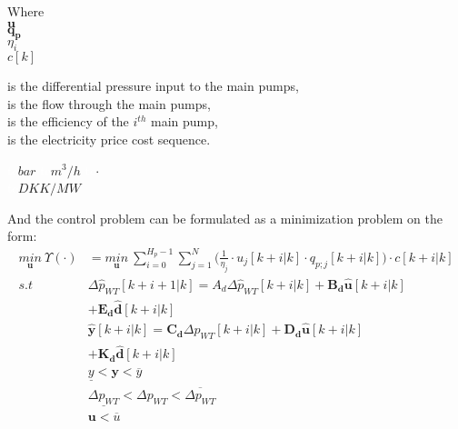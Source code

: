 \begin{minipage}[t]{0.20\textwidth}
Where\\
\hspace*{8mm} $\pmb{u}$ \\
\hspace*{8mm} $\pmb{q_p}$ \\
 \hspace*{8mm} $\eta_i$ \\
\hspace*{8mm} $c[k]$ 
\end{minipage}
\begin{minipage}[t]{0.68\textwidth}
\vspace*{2mm}
is the differential pressure input to the main pumps,\\
is the flow through the main pumps,\\
is the efficiency of the $i^{th}$ main pump,\\
is the electricity price cost sequence.
\end{minipage}
\begin{minipage}[t]{0.10\textwidth}
\vspace*{2mm}
\textcolor{White}{te}$\unit{bar}$
\textcolor{White}{te}$\unit{m^3/h}$
 \textcolor{White}{te}$\unit{\cdot}$\\
\textcolor{White}{te}$\unit{DKK/MW}$
\end{minipage}

And the control problem can be formulated as a minimization problem on the form:
\begin{align}
\underset{\pmb{u}}{min} \:  \Upsilon(\cdot) &= \underset{\pmb{u}}{min} \: \sum_{i=0}^{H_p-1} \sum_{j=1}^{N} \Big(\frac{1}{\eta_j} \cdot u_j[k+i|k] \cdot q_{p;j}[k+i|k]\Big)\cdot c[k+i|k] \label{eqcost1} \\
%
s.t \:\:\:\:\: & \Delta \hat{p}_{WT} [k+i+1|k] = A_d \Delta \hat{p}_{WT}[k+i|k]  + \pmb{B_d} \pmb{\hat{u}}[k+i|k] \\ &+ \pmb{E_d} \pmb{\hat{d}}[k+i|k]  \\
%
&\pmb{\hat{y}}[k+i|k] = \pmb{C_d} \Delta \hat{p}_{WT}[k+i|k] + \pmb{D_d} \pmb{\hat{u}}[k+i|k] \\ &+ \pmb{K_d} \pmb{\hat{d}}[k+i|k] \\
%
& \underline{y} < \pmb{y} < \overline{y} \\
%
& \underline{\Delta p_{WT}} < \Delta p_{WT} < \overline{\Delta p_{WT}} \\
%
& \pmb{u} < \overline{u} \label{eqconst2} 
\end{align}

